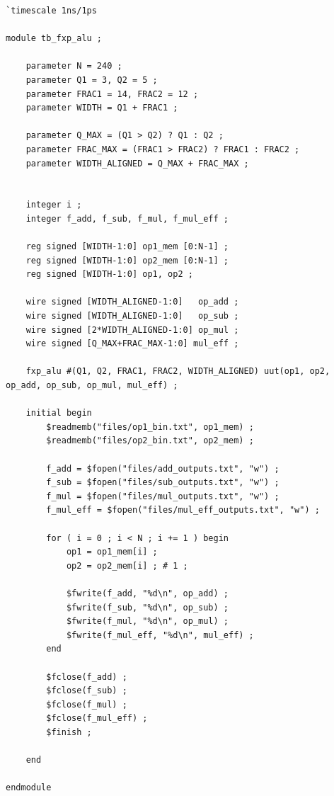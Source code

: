 \documentclass[12pt,a4paper]{article}
\begin{document}
\begin{lstlisting}[style=verilog, caption={Verilog module for performing arithmetic}]
`timescale 1ns/1ps

module tb_fxp_alu ;

    parameter N = 240 ;
    parameter Q1 = 3, Q2 = 5 ;
    parameter FRAC1 = 14, FRAC2 = 12 ;
    parameter WIDTH = Q1 + FRAC1 ;

    parameter Q_MAX = (Q1 > Q2) ? Q1 : Q2 ;
    parameter FRAC_MAX = (FRAC1 > FRAC2) ? FRAC1 : FRAC2 ;
    parameter WIDTH_ALIGNED = Q_MAX + FRAC_MAX ;
    

    integer i ;
    integer f_add, f_sub, f_mul, f_mul_eff ;

    reg signed [WIDTH-1:0] op1_mem [0:N-1] ;
    reg signed [WIDTH-1:0] op2_mem [0:N-1] ;
    reg signed [WIDTH-1:0] op1, op2 ;

    wire signed [WIDTH_ALIGNED-1:0]   op_add ;
    wire signed [WIDTH_ALIGNED-1:0]   op_sub ;
    wire signed [2*WIDTH_ALIGNED-1:0] op_mul ;
    wire signed [Q_MAX+FRAC_MAX-1:0] mul_eff ;

    fxp_alu #(Q1, Q2, FRAC1, FRAC2, WIDTH_ALIGNED) uut(op1, op2, op_add, op_sub, op_mul, mul_eff) ;

    initial begin
        $readmemb("files/op1_bin.txt", op1_mem) ;
        $readmemb("files/op2_bin.txt", op2_mem) ;

        f_add = $fopen("files/add_outputs.txt", "w") ;
        f_sub = $fopen("files/sub_outputs.txt", "w") ;
        f_mul = $fopen("files/mul_outputs.txt", "w") ;
        f_mul_eff = $fopen("files/mul_eff_outputs.txt", "w") ;

        for ( i = 0 ; i < N ; i += 1 ) begin
            op1 = op1_mem[i] ;
            op2 = op2_mem[i] ; # 1 ;

            $fwrite(f_add, "%d\n", op_add) ;
            $fwrite(f_sub, "%d\n", op_sub) ;
            $fwrite(f_mul, "%d\n", op_mul) ;
            $fwrite(f_mul_eff, "%d\n", mul_eff) ;
        end

        $fclose(f_add) ;
        $fclose(f_sub) ;
        $fclose(f_mul) ;
        $fclose(f_mul_eff) ;
        $finish ;

    end

endmodule
\end{lstlisting}
\end{document}
